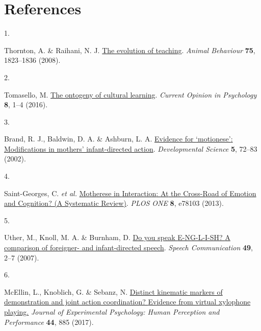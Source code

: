 \documentclass[
  man,floatsintext]{apa6}
\newlength{\cslhangindent}
\newlength{\csllabelwidth}
\newlength{\cslentryspacingunit} %
\newenvironment{CSLReferences}[2] %
 {%
  \setlength{\parindent}{0pt}
  \ifodd #1
  \let\oldpar\par
  \def\par{\hangindent=\cslhangindent\oldpar}
  \fi
  \setlength{\parskip}{#2\cslentryspacingunit}
 }%
 {}
\newcommand{\CSLLeftMargin}[1]{\parbox[t]{\csllabelwidth}{#1}}
\newcommand{\CSLRightInline}[1]{\parbox[t]{\linewidth - \csllabelwidth}{#1}\break}
\begin{document}
\hypertarget{references}{%
\section{References}\label{references}}

\begingroup
\setlength{\parindent}{-0in}
\setlength{\leftskip}{0in}

\hypertarget{refs}{}
\begin{CSLReferences}{0}{0}
\leavevmode{}%
\CSLLeftMargin{1. }%
\CSLRightInline{Thornton, A. \& Raihani, N. J. \href{https://doi.org/10.1016/j.anbehav.2007.12.014}{The evolution of teaching}. \emph{Animal Behaviour} \textbf{75}, 1823--1836 (2008).}

\leavevmode{}%
\CSLLeftMargin{2. }%
\CSLRightInline{Tomasello, M. \href{https://doi.org/10.1016/j.copsyc.2015.09.008}{The ontogeny of cultural learning}. \emph{Current Opinion in Psychology} \textbf{8}, 1--4 (2016).}

\leavevmode{}%
\CSLLeftMargin{3. }%
\CSLRightInline{Brand, R. J., Baldwin, D. A. \& Ashburn, L. A. \href{https://doi.org/10.1111/1467-7687.00211}{Evidence for {`motionese'}: Modifications in mothers' infant-directed action}. \emph{Developmental Science} \textbf{5}, 72--83 (2002).}

\leavevmode{}%
\CSLLeftMargin{4. }%
\CSLRightInline{Saint-Georges, C. \emph{et al.} \href{https://doi.org/10.1371/journal.pone.0078103}{Motherese in {Interaction}: {At} the {Cross-Road} of {Emotion} and {Cognition}? ({A Systematic Review})}. \emph{PLOS ONE} \textbf{8}, e78103 (2013).}

\leavevmode{}%
\CSLLeftMargin{5. }%
\CSLRightInline{Uther, M., Knoll, M. A. \& Burnham, D. \href{https://doi.org/10.1016/j.specom.2006.10.003}{Do you speak {E-NG-L-I-SH}? {A} comparison of foreigner- and infant-directed speech}. \emph{Speech Communication} \textbf{49}, 2--7 (2007).}

\leavevmode{}%
\CSLLeftMargin{6. }%
\CSLRightInline{McEllin, L., Knoblich, G. \& Sebanz, N. \href{https://doi.org/10.1037/xhp0000505}{Distinct kinematic markers of demonstration and joint action coordination? {Evidence} from virtual xylophone playing.} \emph{Journal of Experimental Psychology: Human Perception and Performance} \textbf{44}, 885 (2017).}


\end{CSLReferences}
\end{document}
